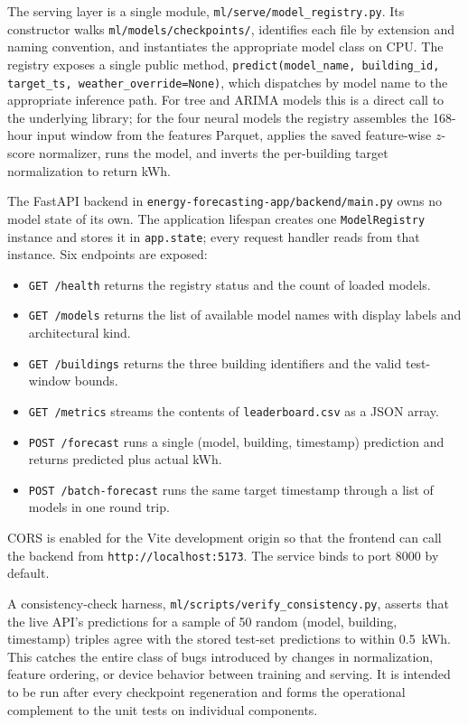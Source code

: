 \documentclass[12pt,a4paper,openany]{report}
\begin{document}
The serving layer is a single module, \texttt{ml/serve/model\_registry.py}. Its constructor walks \texttt{ml/models/checkpoints/}, identifies each file by extension and naming convention, and instantiates the appropriate model class on CPU. The registry exposes a single public method, \texttt{predict(model\_name, building\_id, target\_ts, weather\_override=None)}, which dispatches by model name to the appropriate inference path. For tree and ARIMA models this is a direct call to the underlying library; for the four neural models the registry assembles the 168-hour input window from the features Parquet, applies the saved feature-wise $z$-score normalizer, runs the model, and inverts the per-building target normalization to return kWh.

The FastAPI backend in \texttt{energy-forecasting-app/backend/main.py} owns no model state of its own. The application lifespan creates one \texttt{ModelRegistry} instance and stores it in \texttt{app.state}; every request handler reads from that instance. Six endpoints are exposed:
\begin{itemize}
\setlength\itemsep{0pt}
\item \texttt{GET /health} returns the registry status and the count of loaded models.
\item \texttt{GET /models} returns the list of available model names with display labels and architectural kind.
\item \texttt{GET /buildings} returns the three building identifiers and the valid test-window bounds.
\item \texttt{GET /metrics} streams the contents of \texttt{leaderboard.csv} as a JSON array.
\item \texttt{POST /forecast} runs a single (model, building, timestamp) prediction and returns predicted plus actual kWh.
\item \texttt{POST /batch-forecast} runs the same target timestamp through a list of models in one round trip.
\end{itemize}
CORS is enabled for the Vite development origin so that the frontend can call the backend from \texttt{http://localhost:5173}. The service binds to port 8000 by default.

A consistency-check harness, \texttt{ml/scripts/verify\_consistency.py}, asserts that the live API's predictions for a sample of 50 random (model, building, timestamp) triples agree with the stored test-set predictions to within 0.5~kWh. This catches the entire class of bugs introduced by changes in normalization, feature ordering, or device behavior between training and serving. It is intended to be run after every checkpoint regeneration and forms the operational complement to the unit tests on individual components.
\end{document}
